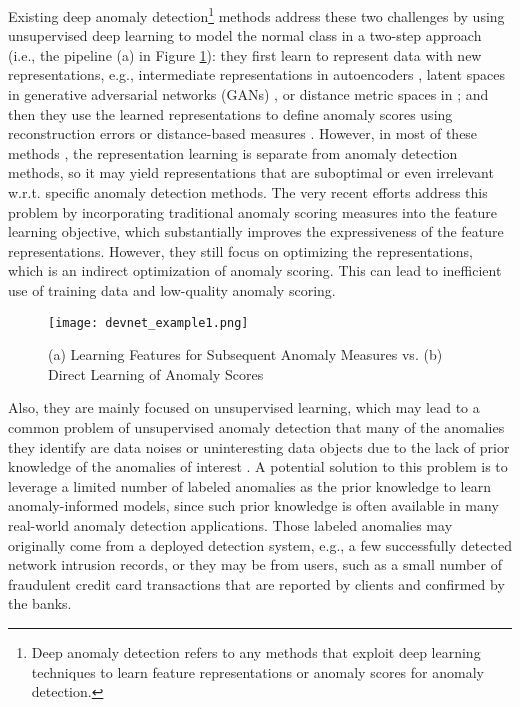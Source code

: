 \documentclass[sigconf]{acmart}
\begin{document}
Existing deep anomaly detection\footnote{Deep anomaly detection refers to any methods that exploit deep learning techniques to learn feature representations or anomaly scores for anomaly detection.} methods \cite{hawkins2002autoencoder,zhou2017autoencoder,chen2017autoencoder,schlegl2017gan,zenati2018gan,pang2018repen,ruff2018deepsvdd} address these two challenges by using unsupervised deep learning to model the normal class in a two-step approach (i.e., the pipeline (a) in Figure \ref{fig:example}): they first learn to represent data with new representations, e.g., intermediate representations in autoencoders \cite{hawkins2002autoencoder,zhou2017autoencoder,chen2017autoencoder}, latent spaces in generative adversarial networks (GANs) \cite{schlegl2017gan,zenati2018gan}, or distance metric spaces in \cite{pang2018repen,ruff2018deepsvdd}; and then they use the learned representations to define anomaly scores using reconstruction errors \cite{hawkins2002autoencoder,zhou2017autoencoder,chen2017autoencoder,schlegl2017gan,zenati2018gan} or distance-based measures \cite{pang2018repen,ruff2018deepsvdd}. However, in most of these methods \cite{hawkins2002autoencoder,zhou2017autoencoder,chen2017autoencoder,schlegl2017gan,zenati2018gan}, the representation learning is separate from anomaly detection methods, so it may yield representations that are suboptimal or even irrelevant w.r.t. specific anomaly detection methods. The very recent efforts \cite{pang2018repen,ruff2018deepsvdd} address this problem by incorporating traditional anomaly scoring measures into the feature learning objective, which substantially improves the expressiveness of the feature representations. However, they still focus on optimizing the representations, which is an indirect optimization of anomaly scoring. This can lead to inefficient use of training data and low-quality anomaly scoring. 



\begin{figure}[h!]
  \centering
    \texttt{[image: devnet\_example1.png]}
  \caption{(a) Learning Features for Subsequent Anomaly Measures vs. (b) Direct Learning of Anomaly Scores}
  \label{fig:example}
\end{figure}

Also, they are mainly focused on unsupervised learning, which may lead to a common problem of unsupervised anomaly detection that many of the anomalies they identify are data noises or uninteresting data objects due to the lack of prior knowledge of the anomalies of interest \cite{aggarwal2017supervised,pang2018repen,siddiqui2018kdd}. A potential solution to this problem is to leverage a limited number of labeled anomalies as the prior knowledge to learn anomaly-informed models, since such prior knowledge is often available in many real-world anomaly detection applications. Those labeled anomalies may originally come from a deployed detection system, e.g., a few successfully detected network intrusion records, or they may be from users, such as a small number of fraudulent credit card transactions that are reported by clients and confirmed by the banks.
\end{document}
